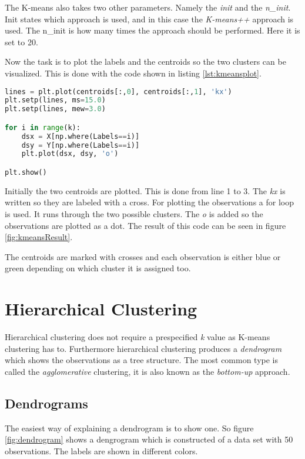 The K-means also takes two other parameters. Namely the \emph{init} and the \emph{n\_init}. Init states which approach is used, and in this case the \emph{K-means++} approach is used. The n\_init is how many times the approach should be performed. Here it is set to 20.

Now the task is to plot the labels and the centroids so the two clusters can be visualized. 
This is done with the code shown in listing \ref{lst:kmeansplot}.

\begin{lstlisting}[language=Python, label=lst:kmeansplot, caption=The code for plotting the two clusters]
lines = plt.plot(centroids[:,0], centroids[:,1], 'kx')
plt.setp(lines, ms=15.0)
plt.setp(lines, mew=3.0)

for i in range(k):
	dsx = X[np.where(Labels==i)]
	dsy = Y[np.where(Labels==i)]
	plt.plot(dsx, dsy, 'o')

plt.show()
\end{lstlisting}

Initially the two centroids are plotted. This is done from line 1 to 3. The \emph{kx} is written so they are labeled with a cross. For plotting the observations a for loop is used. It runs through the two possible clusters. The \emph{o} is added so the observations are plotted as a dot. 
The result of this code can be seen in figure \ref{fig:kmeansResult}.


The centroids are marked with crosses and each observation is either blue or green depending on which cluster it is assigned too.


\section{Hierarchical Clustering}
Hierarchical clustering does not require a prespecified \emph{k} value as K-means clustering has to.
Furthermore hierarchical clustering produces a \emph{dendrogram} which shows the observations as a tree structure.
The most common type is called the \emph{agglomerative} clustering, it is also known as the \emph{bottom-up} approach.

\subsection{Dendrograms}
The easiest way of explaining a dendrogram is to show one. So figure \ref{fig:dendrogram} shows a dengrogram which is constructed of a data set with 50 observations.
The labels are shown in different colors.

